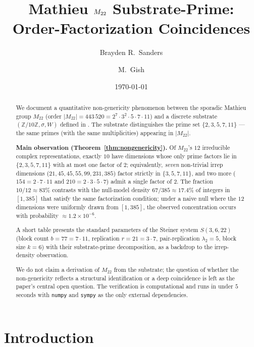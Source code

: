 \documentclass[11pt,reqno]{amsart}
\title[Mathieu $\Mtwentytwo$ Substrate-Prime]
{Mathieu $\Mtwentytwo$ Substrate-Prime: \\
 Order-Factorization Coincidences}
\author{Brayden R.\ Sanders}
\author{M.\ Gish}
\date{\today}
\theoremstyle{plain}
\theoremstyle{definition}
\theoremstyle{remark}
\newcommand{\Z}{\mathbb{Z}}
\newcommand{\Mtwentytwo}{M_{22}}
\newcommand{\sig}{\sigma}
\begin{document}
\begin{abstract}
We document a quantitative non-genericity phenomenon between the
sporadic Mathieu group $\Mtwentytwo$ (order $|\Mtwentytwo| = 443\,520
= 2^{7} \cdot 3^{2} \cdot 5 \cdot 7 \cdot 11$) and a discrete
substrate $(\Z/10\Z, \sig, W)$ defined in \cite{SandersGishFourCore}.
The substrate distinguishes the prime set $\{2, 3, 5, 7, 11\}$ ---
the same primes (with the same multiplicities) appearing in
$|\Mtwentytwo|$.

\textbf{Main observation (Theorem~\ref{thm:nongenericity}).} Of
$\Mtwentytwo$'s $12$ irreducible complex representations, exactly
$10$ have dimensions whose only prime factors lie in
$\{2, 3, 5, 7, 11\}$ with at most one factor of $2$; equivalently,
\emph{seven} non-trivial irrep dimensions ($21, 45, 45, 55, 99, 231,
385$) factor strictly in $\{3, 5, 7, 11\}$, and two more ($154 = 2
\cdot 7 \cdot 11$ and $210 = 2 \cdot 3 \cdot 5 \cdot 7$) admit a
single factor of $2$. The fraction $10/12 \approx 83\%$ contrasts
with the null-model density $67/385 \approx 17.4\%$ of integers in
$[1, 385]$ that satisfy the same factorization condition; under a
naive null where the $12$ dimensions were uniformly drawn from
$[1, 385]$, the observed concentration occurs with probability
$\approx 1.2 \times 10^{-6}$.

A short table presents the standard parameters of the Steiner system
$S(3, 6, 22)$ (block count $b = 77 = 7 \cdot 11$, replication
$r = 21 = 3 \cdot 7$, pair-replication $\lambda_{2} = 5$, block size
$k = 6$) with their substrate-prime decomposition, as a backdrop to
the irrep-density observation.

We do not claim a derivation of $\Mtwentytwo$ from the substrate;
the question of whether the non-genericity reflects a structural
identification or a deep coincidence is left as the paper's central
open question. The verification is computational and runs in under
$5$ seconds with \texttt{numpy} and \texttt{sympy} as the only
external dependencies.
\end{abstract}

\maketitle

\tableofcontents

\section{Introduction}
\end{document}
